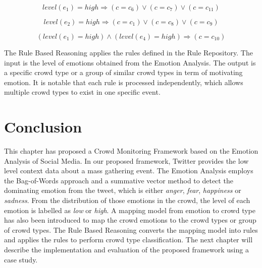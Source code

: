 \begin{equation}
\label{eq:rule3}
	level(e_1) = high \Rightarrow (c = c_6) \lor (c = c_7) \lor (c = c_{11})
\end{equation}

\begin{equation}
\label{eq:rule4}
	level(e_2) = high \Rightarrow (c = c_1) \lor (c = c_8) \lor (c = c_9)
\end{equation}

\begin{equation}
\label{eq:rule5}
	(level(e_1) = high) \land (level(e_4) = high) \Rightarrow (c = c_{10})
\end{equation}

The Rule Based Reasoning applies the rules defined in the Rule Repository. The input is the level of emotions obtained from the Emotion Analysis. The output is a specific crowd type or a group of similar crowd types in term of motivating emotion. It is notable that each rule is processed independently, which allows multiple crowd types to exist in one specific event.

\section{Conclusion}
This chapter has proposed a Crowd Monitoring Framework based on the Emotion Analysis of Social Media. In our proposed framework, Twitter provides the low level context data about a mass gathering event. The Emotion Analysis employs the Bag-of-Words approach and a summative vector method to detect the dominating emotion from the tweet, which is either \textit{anger}, \textit{fear}, \textit{happiness} or \textit{sadness}. From the distribution of those emotions in the crowd, the level of each emotion is labelled as \textit{low} or \textit{high}. A mapping model from emotion to crowd type has also been introduced to map the crowd emotions to the crowd types or group of crowd types. The Rule Based Reasoning converts the mapping model into rules and applies the rules to perform crowd type classification. The next chapter will describe the implementation and evaluation of the proposed framework using a case study.